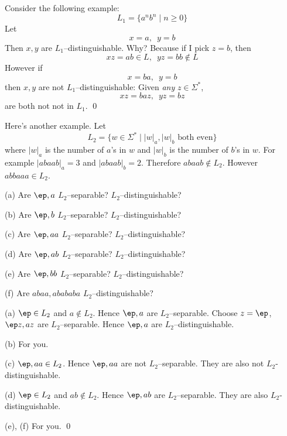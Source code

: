 \newpage
\begin{eg}
Consider the following example:
\[
L_1 = \{a^n b^n \mid n \geq 0\}
\]
Let
\[
x = a, \,\,\, y = b
\]
Then $x,y$ are $L_1$--distinguishable. Why?
Because if I pick $z = b$,
then
\[
xz = ab \in L, \,\,\, yz = bb \not\in L
\]
However if
\[
x = ba, \,\,\, y = b
\]
then $x,y$ are not $L_1$--distinguishable:
Given \textit{any} $z \in \Sigma^*$,
\[
xz = baz, \,\,\, yz = bz
\]
are both not not in $L_1$.
\qed
\end{eg}



\newpage
\begin{eg}
Here's another example.
Let
\[
L_2 = \{w \in \Sigma^* \mid |w|_a, |w|_b \text{ both even}\}
\]
where
$|w|_a$ is the number of $a$'s in $w$
and
$|w|_b$ is the number of $b$'s in $w$.
For example $|abaab|_a = 3$ and $|abaab|_b = 2$.
Therefore $abaab \not\in L_2$.
However $abbaaa \in L_2$.
\begin{tightlist}
  \item[\textnormal{(a)}] Are $\ep, a$ $L_2$--separable? $L_2$--distinguishable?
  \item[\textnormal{(b)}] Are $\ep, b$ $L_2$--separable? $L_2$--distinguishable?
  \item[\textnormal{(c)}] Are $\ep, aa$ $L_2$--separable? $L_2$--distinguishable?
  \item[\textnormal{(d)}] Are $\ep, ab$ $L_2$--separable? $L_2$--distinguishable?
  \item[\textnormal{(e)}] Are $\ep, bb$ $L_2$--separable? $L_2$--distinguishable?
  \item[\textnormal{(f)}] Are $abaa, abababa$ $L_2$--distinguishable?
\end{tightlist}
\end{eg}

\SOLUTION
(a) $\ep \in L_2$ and $a \not\in L_2$.
Hence $\ep, a$ are $L_2$--separable.
Choose $z = \ep$, $\ep z, a z$ are $L_2$--separable.
Hence $\ep, a$ are $L_2$--distinguishable.

(b) For you.

(c) $\ep, aa \in L_2$.
Hence $\ep, aa$ are not $L_2$--separable.
They are also not $L_2$-distinguishable.

(d) $\ep \in L_2$ and $ab \not\in L_2$.
Hence $\ep, ab$ are $L_2$--separable.
They are also $L_2$-distinguishable.

(e), (f) For you.
\qed

